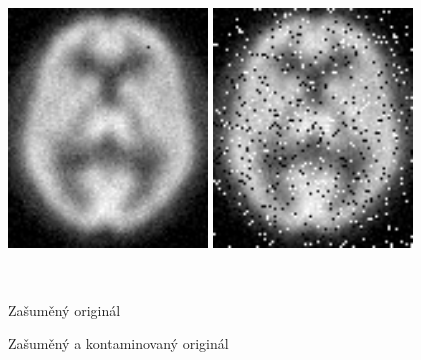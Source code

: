      \begin{figure}[h]
        \begin{minipage}[l]{0.5\textwidth}
            \center
            \includegraphics[width = 150pt]{src/8Appendix/final/10-100noise.png}
        \end{minipage}
        \begin{minipage}[r]{0.5\textwidth}
            \center
            \includegraphics[width = 150pt]{src/8Appendix/final/10-100contaminated.png}
        \end{minipage}
        \\
        \begin{minipage}[l]{0.5\textwidth}
            \caption{Zašuměný originál}
        \end{minipage}
        \begin{minipage}[r]{0.5\textwidth}
            \caption{Zašuměný a kontaminovaný originál}
        \end{minipage}
    \end{figure}


